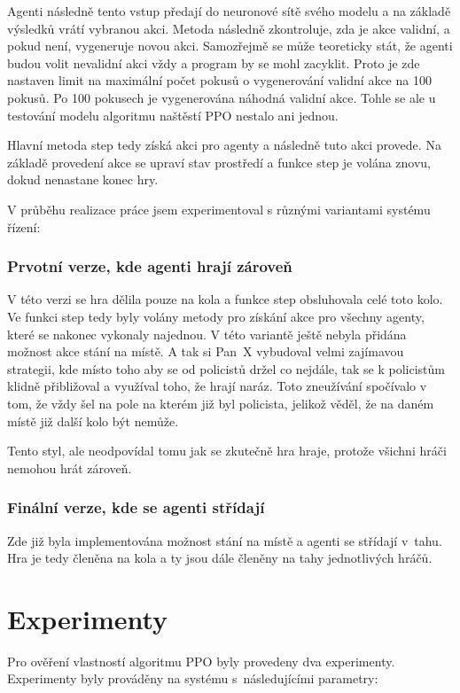 Agenti následně tento vstup předají do neuronové sítě svého modelu a na základě výsledků vrátí vybranou akci.
Metoda následně zkontroluje, zda je akce validní, a pokud není, vygeneruje novou akci.
Samozřejmě se může teoreticky stát, že agenti budou volit nevalidní akci vždy a program by se mohl zacyklit.
Proto je zde nastaven limit na maximální počet pokusů o vygenerování validní akce na 100 pokusů.
Po 100 pokusech je vygenerována náhodná validní akce.
Tohle se ale u testování modelu algoritmu naštěstí PPO nestalo ani jednou.

Hlavní metoda step tedy získá akci pro agenty a následně tuto akci provede.
Na základě provedení akce se upraví stav prostředí a funkce step je volána znovu, dokud nenastane konec hry.

\bigskip
\bigskip

V průběhu realizace práce jsem experimentoval s různými variantami systému řízení:
\subsection{Prvotní verze, kde agenti hrají zároveň}
V této verzi se hra dělila pouze na kola a funkce step obsluhovala celé toto kolo.
Ve funkci step tedy byly volány metody pro získání akce pro všechny agenty, které se nakonec vykonaly najednou.
V této variantě ještě nebyla přidána možnost akce stání na místě.
A tak si Pan~X vybudoval velmi zajímavou strategii, kde místo toho aby se od policistů držel co nejdále, tak se k policistům klidně přibližoval a využíval toho, že hrají naráz.
Toto zneužívání spočívalo v tom, že vždy šel na pole na kterém již byl policista, jelikož věděl, že na daném místě již další kolo být nemůže.

Tento styl, ale neodpovídal tomu jak se zkutečně hra hraje, protože všichni hráči nemohou hrát zároveň.
\subsection{Finální verze, kde se agenti střídají}
Zde již byla implementována možnost stání na místě a agenti se střídají v~tahu.
Hra je tedy členěna na kola a ty jsou dále členěny na tahy jednotlivých hráčů.

\chapter{Experimenty}
\label{ch:experimenty}

Pro ověření vlastností algoritmu PPO byly provedeny dva experimenty.
Experimenty byly prováděny na systému s~následujícími parametry:

